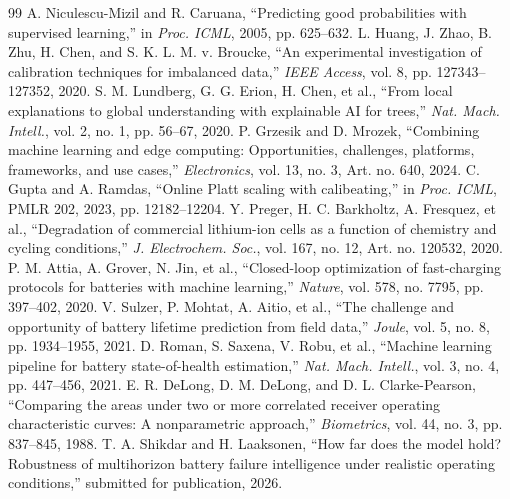 \begin{thebibliography}{99}
 A. Niculescu-Mizil and R. Caruana, ``Predicting good probabilities with supervised learning,'' in \emph{Proc. ICML}, 2005, pp. 625--632.
 L. Huang, J. Zhao, B. Zhu, H. Chen, and S. K. L. M. v. Broucke, ``An experimental investigation of calibration techniques for imbalanced data,'' \emph{IEEE Access}, vol. 8, pp. 127343--127352, 2020.
 S. M. Lundberg, G. G. Erion, H. Chen, et al., ``From local explanations to global understanding with explainable AI for trees,'' \emph{Nat. Mach. Intell.}, vol. 2, no. 1, pp. 56--67, 2020.
 P. Grzesik and D. Mrozek, ``Combining machine learning and edge computing: Opportunities, challenges, platforms, frameworks, and use cases,'' \emph{Electronics}, vol. 13, no. 3, Art. no. 640, 2024.
 C. Gupta and A. Ramdas, ``Online Platt scaling with calibeating,'' in \emph{Proc. ICML}, PMLR 202, 2023, pp. 12182--12204.
 Y. Preger, H. C. Barkholtz, A. Fresquez, et al., ``Degradation of commercial lithium-ion cells as a function of chemistry and cycling conditions,'' \emph{J. Electrochem. Soc.}, vol. 167, no. 12, Art. no. 120532, 2020.
 P. M. Attia, A. Grover, N. Jin, et al., ``Closed-loop optimization of fast-charging protocols for batteries with machine learning,'' \emph{Nature}, vol. 578, no. 7795, pp. 397--402, 2020.
 V. Sulzer, P. Mohtat, A. Aitio, et al., ``The challenge and opportunity of battery lifetime prediction from field data,'' \emph{Joule}, vol. 5, no. 8, pp. 1934--1955, 2021.
 D. Roman, S. Saxena, V. Robu, et al., ``Machine learning pipeline for battery state-of-health estimation,'' \emph{Nat. Mach. Intell.}, vol. 3, no. 4, pp. 447--456, 2021.
 E. R. DeLong, D. M. DeLong, and D. L. Clarke-Pearson, ``Comparing the areas under two or more correlated receiver operating characteristic curves: A nonparametric approach,'' \emph{Biometrics}, vol. 44, no. 3, pp. 837--845, 1988.
 T. A. Shikdar and H. Laaksonen, ``How far does the model hold? Robustness of multihorizon battery failure intelligence under realistic operating conditions,'' submitted for publication, 2026.
\end{thebibliography}

\EOD


